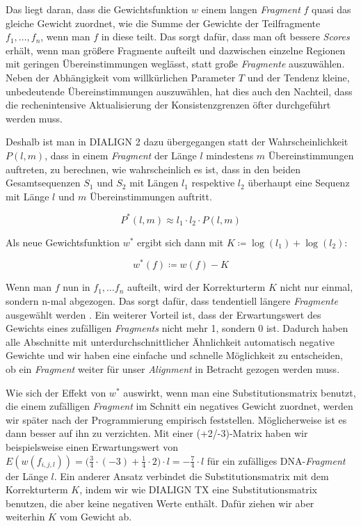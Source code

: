 Das liegt daran, dass die Gewichtsfunktion $w$ einem langen \emph{Fragment} $f$ quasi das gleiche Gewicht zuordnet, wie die Summe der Gewichte der Teilfragmente $f_1, \dots, f_n$, wenn man $f$ in diese teilt. Das sorgt dafür, dass man oft bessere \emph{Scores} erhält, wenn man größere Fragmente aufteilt und dazwischen einzelne Regionen mit geringen Übereinstimmungen weglässt, statt große \emph{Fragmente} auszuwählen. Neben der Abhängigkeit vom willkürlichen Parameter $T$ und der Tendenz kleine, unbedeutende Übereinstimmungen auszuwählen, hat dies auch den Nachteil, dass die rechenintensive Aktualisierung der Konsistenzgrenzen öfter durchgeführt werden muss. 

Deshalb ist man in DIALIGN 2 dazu übergegangen statt der Wahrscheinlichkeit $P(l,m)$, dass in einem \emph{Fragment} der Länge $l$ mindestens $m$ Übereinstimmungen auftreten, zu berechnen, wie wahrscheinlich es ist, dass in den beiden Gesamtsequenzen $S_1$ und $S_2$ mit Längen $l_1$ respektive $l_2$ überhaupt eine Sequenz mit Länge $l$ und $m$ Übereinstimmungen auftritt. 

\begin{equation}
	P^*(l,m) \approx l_1\cdot l_2\cdot P(l,m)
\end{equation}

Als neue Gewichtsfunktion $w^*$ ergibt sich dann mit $K \coloneqq \log(l_1) + \log(l_2)$:

\begin{equation}
	w^*(f) \coloneqq w(f) - K
\end{equation}

Wenn man $f$ nun in $f_1, \dots f_n$ aufteilt, wird der Korrekturterm $K$ nicht nur einmal, sondern n-mal abgezogen. Das sorgt dafür, dass tendentiell längere \emph{Fragmente} ausgewählt werden \citep{m99}. Ein weiterer Vorteil ist, dass der Erwartungswert des Gewichts eines zufälligen \emph{Fragments} nicht mehr 1, sondern 0 ist. Dadurch haben alle Abschnitte mit unterdurchschnittlicher Ähnlichkeit automatisch negative Gewichte und wir haben eine einfache und schnelle Möglichkeit zu entscheiden, ob ein \emph{Fragment} weiter für unser \emph{Alignment} in Betracht gezogen werden muss.

Wie sich der Effekt von $w^*$ auswirkt, wenn man eine Substitutionsmatrix benutzt, die einem zufälligen \emph{Fragment} im Schnitt ein negatives Gewicht zuordnet, werden wir später nach der Programmierung empirisch feststellen. Möglicherweise ist es dann besser auf ihn zu verzichten. Mit einer (+2/-3)-Matrix haben wir beispielsweise einen Erwartungswert von $E(w(f_{i,j,l})) = \big( \frac{3}{4}\cdot(-3) + \frac{1}{4}\cdot2 \big) \cdot l = -\frac{7}{4}\cdot l$ für ein zufälliges DNA-\emph{Fragment} der Länge $l$. Ein anderer Ansatz verbindet die Substitutionsmatrix mit dem Korrekturterm $K$, indem wir wie DIALIGN TX eine Substitutionsmatrix benutzen, die aber keine negativen Werte enthält. Dafür ziehen wir aber weiterhin $K$ vom Gewicht ab.
 
